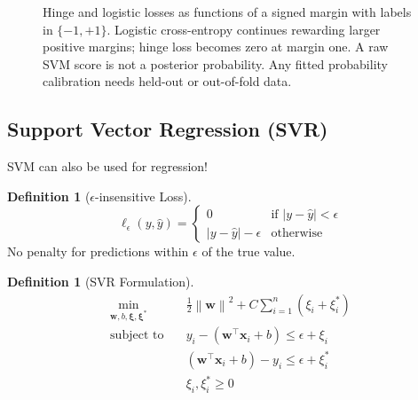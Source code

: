 \documentclass[11pt,twoside]{article}
\numberwithin{equation}{section}
\newcommand{\vect}[1]{\bm{#1}}
\newcommand{\norm}[1]{\left\lVert#1\right\rVert}
\theoremstyle{plain}
\theoremstyle{definition}
\newtheorem{definition}[theorem]{Definition}
\theoremstyle{remark}
\begin{document}
\begin{figure}[H]
\centering
{}
\caption{Hinge and logistic losses as functions of a signed margin with labels in $\{-1,+1\}$. Logistic cross-entropy continues rewarding larger positive margins; hinge loss becomes zero at margin one. A raw SVM score is not a posterior probability. Any fitted probability calibration needs held-out or out-of-fold data.}
\end{figure}

\subsection{Support Vector Regression (SVR)}

SVM can also be used for regression!

\begin{definition}[$\epsilon$-insensitive Loss]
\[
\ell_\epsilon(y, \hat{y}) = \begin{cases}
0 & \text{if } |y - \hat{y}| < \epsilon \\
|y - \hat{y}| - \epsilon & \text{otherwise}
\end{cases}
\]
No penalty for predictions within $\epsilon$ of the true value.
\end{definition}

\begin{definition}[SVR Formulation]
\[
\begin{aligned}
\min_{\vect{w}, b,\vect{\xi},\vect{\xi}^*} \quad & \frac{1}{2}\norm{\vect{w}}^2 + C\sum_{i=1}^n (\xi_i + \xi_i^*)\\
\text{subject to} \quad & y_i - (\vect{w}^\top\vect{x}_i + b) \leq \epsilon + \xi_i \\
& (\vect{w}^\top\vect{x}_i + b) - y_i \leq \epsilon + \xi_i^* \\
& \xi_i, \xi_i^* \geq 0
\end{aligned}
\]
\end{definition}
\end{document}
